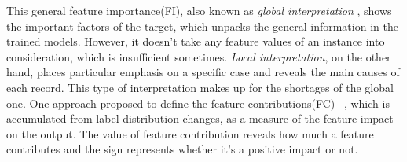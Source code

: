 This general feature importance(FI), also known as 
{\em global interpretation} , shows the important factors of the target, 
which unpacks the general information in the trained models. 
However, it doesn't take any feature values of an instance into consideration, 
which is insufficient sometimes. 
{\em Local interpretation}, on the other hand, places particular emphasis 
on a specific case and reveals the main causes of each record. 
This type of interpretation makes up for the shortages of the global one.
One approach proposed to define the feature contributions(FC)~\cite{palczewska2013interpreting}
 , which is accumulated from label distribution changes, as a measure of the 
feature impact on the output. The value of feature contribution reveals how 
much a feature contributes and the sign represents whether it's a positive 
impact or not. 



